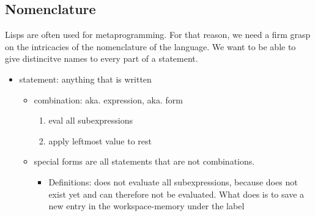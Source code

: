 \subsection{Nomenclature}

Lisps are often used for metaprogramming. For that reason, we need a firm grasp on the intricacies of the nomenclature of the language. We want to be able to give distincitve names to every part of a statement. 

\begin{itemize}
  \item statement: anything that is written 
  \begin{itemize}
    \item combination: aka. expression, aka. form 
    \begin{enumerate}
      \item eval all subexpressions
      \item apply leftmost value to rest
    \end{enumerate}
  \item special forms are all statements that are not combinations. 
  \begin{itemize}
    \item Definitions:  does not evaluate all subexpressions, because  does not exist yet and can therefore not be evaluated. What  does is to save a new entry in the workspace-memory under the label 
  \end{itemize}
  \end{itemize}
\end{itemize}